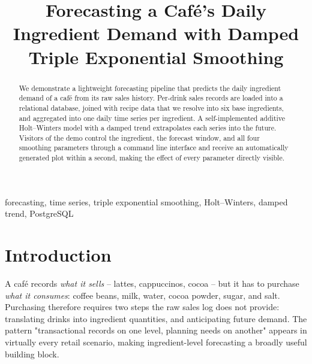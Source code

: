 \documentclass[conference]{IEEEtran}
\begin{document}
\title{Forecasting a Caf\'e's Daily Ingredient Demand with Damped Triple Exponential Smoothing}

\author{
\and
{}
\and
{}
}

\maketitle

\begin{abstract}
We demonstrate a lightweight forecasting pipeline that predicts the daily ingredient
demand of a caf\'e from its raw sales history. Per-drink sales records are loaded into
a relational database, joined with recipe data that we resolve into six base
ingredients, and aggregated into one daily time series per ingredient. A
self-implemented additive Holt--Winters model with a damped trend extrapolates each
series into the future. Visitors of the demo control the ingredient, the forecast
window, and all four smoothing parameters through a command line interface and receive
an automatically generated plot within a second, making the effect of every parameter
directly visible.
\end{abstract}

\begin{IEEEkeywords}
forecasting, time series, triple exponential smoothing, Holt--Winters, damped trend, PostgreSQL
\end{IEEEkeywords}

\section{Introduction}
A caf\'e records \emph{what it sells} -- lattes, cappuccinos, cocoa -- but it has to
purchase \emph{what it consumes}: coffee beans, milk, water, cocoa powder, sugar, and
salt. Purchasing therefore requires two steps the raw sales log does not provide:
translating drinks into ingredient quantities, and anticipating future demand. The pattern "transactional records on one level,
planning needs on another" appears in virtually every retail scenario, making
ingredient-level forecasting a broadly useful building block.
\end{document}
